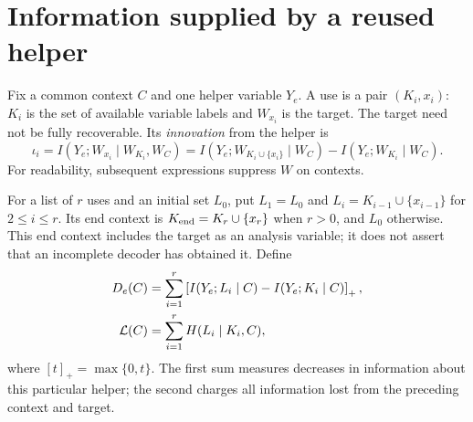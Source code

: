 \section{Information supplied by a reused helper}\label{sec:helpers}

Fix a common context $C$ and one helper variable $Y_e$. A use is a pair
$(K_i,x_i)$: $K_i$ is the set of available variable labels and $W_{x_i}$
is the target. The target need not be fully recoverable. Its
\emph{innovation} from the helper is
\begin{equation}
\iota_i=I(Y_e;W_{x_i}\mid W_{K_i},W_C)
=I(Y_e;W_{K_i\cup\{x_i\}}\mid W_C)
 -I(Y_e;W_{K_i}\mid W_C).
\label{eq:innovation}
\end{equation}
For readability, subsequent expressions suppress $W$ on contexts.

For a list of $r$ uses and an initial set $L_0$, put $L_1=L_0$ and
$L_i=K_{i-1}\cup\{x_{i-1}\}$ for $2\le i\le r$. Its end context is
$K_{\rm end}=K_r\cup\{x_r\}$ when $r>0$, and $L_0$ otherwise.
This end context includes the target as an analysis variable; it does
not assert that an incomplete decoder has obtained it. Define
\begin{align}
D_e(C)&=\sum_{i=1}^r
 \left[I(Y_e;L_i\mid C)-I(Y_e;K_i\mid C)\right]_{+},\label{eq:helper-loss}\\
\mathcal L(C)&=\sum_{i=1}^r H(L_i\mid K_i,C),\label{eq:whole-loss}
\end{align}
where $[t]_+=\max\{0,t\}$. The first sum measures decreases in
information about this particular helper; the second charges all
information lost from the preceding context and target.

